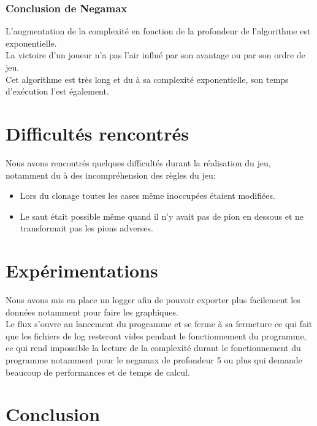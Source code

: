 \documentclass[12pt]{article}
\begin{document}
\subsubsection{Conclusion de Negamax}

L’augmentation de la complexité en fonction de la profondeur de l’algorithme est exponentielle.\\
La victoire d’un joueur n’a pas l’air influé par son avantage ou par son ordre de jeu.\\
Cet algorithme est très long et du à sa complexité exponentielle, son temps d’exécution l’est également.

\section{Difficultés rencontrés}

Nous avons rencontrés quelques difficultés durant la réalisation du jeu, notamment du à des incompréhension des règles du jeu:\\

\begin{itemize}
    \item Lors du clonage toutes les cases même inoccupées étaient modifiées.
    \item Le saut était possible même quand il n'y avait pas de pion en dessous et ne transformait pas les pions adverses.
\end{itemize}

\section{Expérimentations}

Nous avons mis en place un logger afin de pouvoir exporter plus facilement les données notamment pour faire les graphiques.\\

Le flux s'ouvre au lancement du programme et se ferme à sa fermeture ce qui fait que les fichiers de log resteront vides pendant le fonctionnement du programme, ce qui rend impossible la lecture de la complexité durant le fonctionnement du programme notamment pour le negamax de profondeur 5 ou plus qui demande beaucoup de performances et de temps de calcul.


\section{Conclusion}
\end{document}
